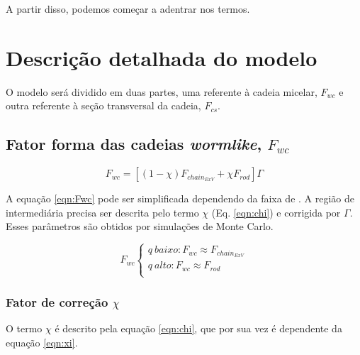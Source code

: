 \begin{apendicesenv}
	
	A partir disso, podemos começar a adentrar nos termos.
	
	\section{Descrição detalhada do modelo}
	
	O modelo será dividido em duas partes, uma referente à cadeia micelar, $F_{wc}$ e outra referente à seção transversal da cadeia, $F_{cs}$.
	
	\subsection{Fator forma das cadeias \emph{wormlike}, $F_{wc}$}
	
	\begin{equation}
	F_{wc} = \left[\left(1 - \chi\right)F_{chain_{ExV}} + \chi F_{rod}\right]\Gamma
	\label{eqn:Fwc}
	\end{equation}
	
	A equação \ref{eqn:Fwc} pode ser simplificada dependendo da faixa de \q. A região de \q intermediária precisa ser descrita pelo termo $\chi$ (Eq. \ref{eqn:chi}) e corrigida por $\Gamma$. Esses parâmetros são obtidos por simulações de Monte Carlo.
	
	\begin{equation}
	F_{wc} \left\{
	\begin{matrix}
	q\ baixo: F_{wc} \approx F_{chain_{ExV}} \\
	q\ alto: F_{wc} \approx F_{rod} \\
	\end{matrix} \right.
	\end{equation}
	
	
	\subsubsection{Fator de correção $\chi$}
	O termo $\chi$ é descrito pela equação \ref{eqn:chi}, que por sua vez é dependente da equação \ref{eqn:xi}.
	

\end{apendicesenv}
